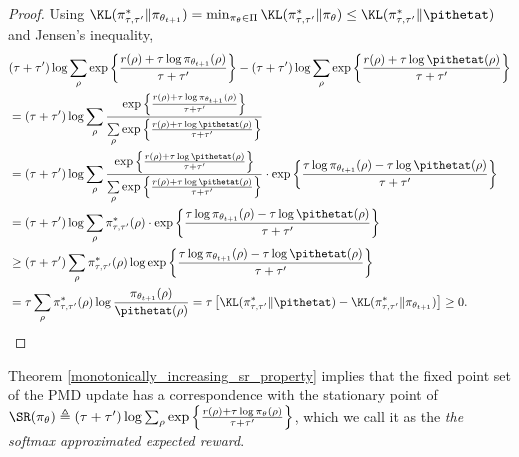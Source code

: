 \documentclass{article}
\begin{document}
\begin{proof}
Using $\KL(\pi_{\tau,\tau^{\prime}}^* \| \pi_{\theta_{t+1}}) = \min_{\pi_\theta \in \Pi}{ \KL(\pi_{\tau,\tau^{\prime}}^* \| \pi_\theta)} \le \KL(\pi_{\tau,\tau^{\prime}}^* \| \pithetat)$ and Jensen's inequality,
\begin{equation*}
\begin{split}
	&(\tau + \tau^{\prime}) \log{ \sum\limits_{\rho}{ \exp\left\{ \frac{r(\rho) + \tau \log{\pi_{\theta_{t+1}}(\rho)} }{\tau + \tau^{\prime}} \right\} }} - (\tau + \tau^{\prime}) \log{\sum\limits_{\rho}{  \exp\left\{ \frac{r(\rho) + \tau \log{\pithetat(\rho)} }{\tau + \tau^{\prime}} \right\} }} \\
	&= (\tau + \tau^{\prime}) \log{ \sum\limits_{\rho}{ \frac{  \exp\left\{ \frac{r(\rho) + \tau \log{\pi_{\theta_{t+1}}(\rho)} }{\tau + \tau^{\prime}} \right\}  }{ \sum\limits_{\rho}{  \exp\left\{ \frac{r(\rho) + \tau \log{\pithetat(\rho)} }{\tau + \tau^{\prime}} \right\} } }  } } \\
	&= (\tau + \tau^{\prime}) \log{ \sum\limits_{\rho}{ \frac{  \exp\left\{ \frac{r(\rho) + \tau \log{\pithetat(\rho)} }{\tau + \tau^{\prime}} \right\}  }{ \sum\limits_{\rho}{  \exp\left\{ \frac{r(\rho) + \tau \log{\pithetat(\rho)} }{\tau + \tau^{\prime}} \right\} } }  } \cdot \exp\left\{ \frac{\tau \log{\pi_{\theta_{t+1}}(\rho)} - \tau \log{\pithetat(\rho)} }{\tau + \tau^{\prime}} \right\} } \\
	&= (\tau + \tau^{\prime}) \log{ \sum\limits_{\rho}{ \pi_{\tau,\tau^{\prime}}^*(\rho) } \cdot \exp\left\{ \frac{\tau \log{\pi_{\theta_{t+1}}(\rho)} - \tau \log{\pithetat(\rho)} }{\tau + \tau^{\prime}} \right\} } \\
	&\ge (\tau + \tau^{\prime}) \sum\limits_{\rho}{ \pi_{\tau,\tau^{\prime}}^*(\rho) \log{ \exp\left\{ \frac{\tau \log{\pi_{\theta_{t+1}}(\rho)} - \tau \log{\pithetat(\rho)} }{\tau + \tau^{\prime}} \right\} } } \\
	&= \tau \sum\limits_{\rho}{ \pi_{\tau,\tau^{\prime}}^*(\rho) \log{ \frac{\pi_{\theta_{t+1}}(\rho)}{\pithetat(\rho)} } } = \tau \left[ \KL(\pi_{\tau,\tau^{\prime}}^* \| \pithetat) - \KL(\pi_{\tau,\tau^{\prime}}^* \| \pi_{\theta_{t+1}})\right] \ge 0. \qedhere
\end{split}
\end{equation*}
\end{proof}

Theorem \ref{monotonically_increasing_sr_property} implies that the fixed point set of the PMD update has a correspondence with the stationary point of $\SR(\pi_\theta) \triangleq (\tau + \tau^{\prime})\log{ \sum_{\rho}{ \exp\left\{ \frac{r(\rho) + \tau \log{\pi_\theta(\rho)} }{\tau + \tau^{\prime}} \right\} }}$, which we call it as the \textit{the softmax approximated expected reward}.
\end{document}
